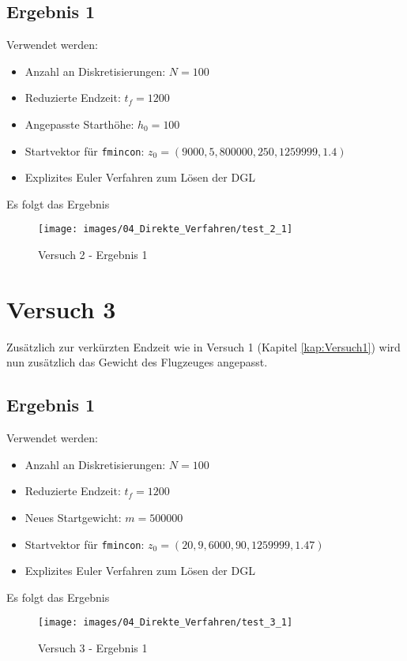 \subsection{Ergebnis 1}
Verwendet werden:
\begin{itemize}
\item Anzahl an Diskretisierungen: $N = 100$ 
\item Reduzierte Endzeit: $t_f = 1200$
\item Angepasste Starthöhe: $h_0 = 100$
\item Startvektor für \texttt{fmincon}: $z_0 = (9000,5,800000,250,1259999,1.4)$
\item Explizites Euler Verfahren zum Lösen der DGL
\end{itemize}
Es folgt das Ergebnis
\begin{figure}[H]
\begin{center}
\texttt{[image: images/04\_Direkte\_Verfahren/test\_2\_1]}
\caption{Versuch 2 - Ergebnis 1}\label{img:test_2_1}
\end{center}
\end{figure}


















\newpage
\section{Versuch 3}
Zusätzlich zur verkürzten Endzeit wie in Versuch 1 (Kapitel \ref{kap:Versuch1}) wird nun zusätzlich das Gewicht des Flugzeuges angepasst.

\subsection{Ergebnis 1}
Verwendet werden:
\begin{itemize}
\item Anzahl an Diskretisierungen: $N = 100$ 
\item Reduzierte Endzeit: $t_f = 1200$
\item Neues Startgewicht: $m = 500000$
\item Startvektor für \texttt{fmincon}: $z_0 = (20,9,6000,90,1259999,1.47)$
\item Explizites Euler Verfahren zum Lösen der DGL
\end{itemize}
Es folgt das Ergebnis
\begin{figure}[H]
\begin{center}
\texttt{[image: images/04\_Direkte\_Verfahren/test\_3\_1]}
\caption{Versuch 3 - Ergebnis 1}\label{img:test_3_1}
\end{center}
\end{figure}








